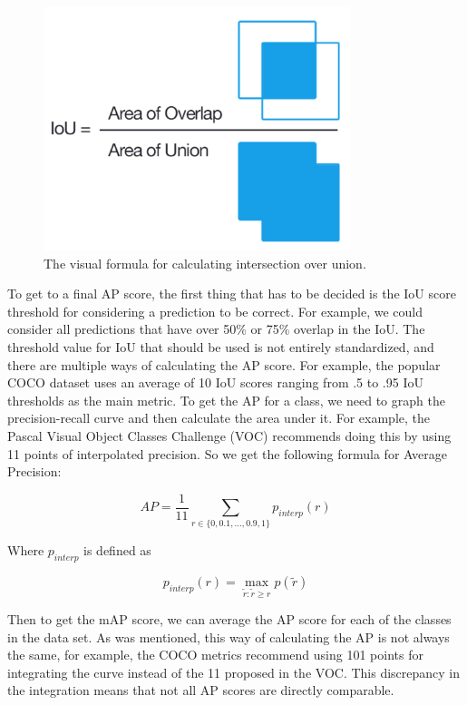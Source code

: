 \begin{figure}[h!]
    \centering
    \includegraphics[width=0.8\textwidth]{imgs/intersection_over_union.png}
    \caption{The visual formula for calculating intersection over union.}
\end{figure}

To get to a final AP score, the first thing that has to be decided is the IoU score threshold for considering a prediction to be correct.
For example, we could consider all predictions that have over 50\% or 75\% overlap in the IoU.
The threshold value for IoU that should be used is not entirely standardized, and there are multiple ways of calculating the AP score.
For example, the popular COCO dataset \citep{COCO} uses an average of 10 IoU scores ranging from .5 to .95 IoU thresholds as the main metric.
To get the AP for a class, we need to graph the precision-recall curve and then calculate the area under it.
For example, the Pascal Visual Object Classes Challenge (VOC) \citep{PVOC} recommends doing this by using 11 points of interpolated precision.
So we get the following formula for Average Precision:

\[AP = \frac{1} {11} \sum_{r \in \{0, 0.1, \ldots, 0.9 , 1\}}{p_{interp}(r)}\] \noindent

Where $p_{interp}$ is defined as

\[p_{interp}(r) = \max \limits_{\tilde{r}:\tilde{r} \geq r} p(\tilde{r})\]

Then to get the mAP score, we can average the AP score for each of the classes in the data set.
As was mentioned, this way of calculating the AP is not always the same, for example, the COCO metrics \citep{COCO_SITE} recommend using 101 points for integrating the curve instead of the 11 proposed in the VOC.
This discrepancy in the integration means that not all AP scores are directly comparable.

